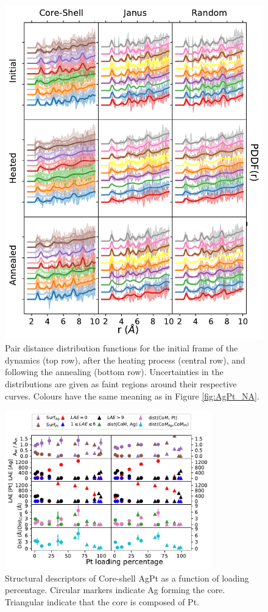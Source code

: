 \begin{figure}
    \centering
    \includegraphics{figures/MD/Alloys/Melt_Ag-Pt.pdf}
    \caption{Pair distance distribution functions for the initial frame of the dynamics (top row), after the heating process (central row), and following the annealing (bottom row). Uncertainties in the distributions are given as faint regions around their respective curves. Colours have the same meaning as in Figure \ref{fig:AgPt_NA}. }
    \label{fig:AgPt_PDF}
\end{figure}

\begin{figure}
    \centering
    \includegraphics[width=0.8\textwidth]{figures/MD/Alloys/Core-Shell_Ag-Pt.pdf}
    \caption{Structural descriptors of Core-shell AgPt as a function of loading percentage. Circular markers indicate Ag forming the core. Triangular indicate that the core is composed of Pt.}
    \label{fig:AgPtCS_Dyn}
\end{figure}


